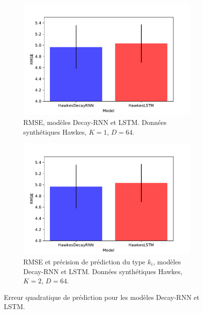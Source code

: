 \documentclass[../main.tex]{subfiles}
\begin{document}
\begin{figure}
	\centering
	\begin{subfigure}{0.47\linewidth}
		\centering
		\includegraphics[width=\linewidth]{../results/1D_Hawkes_Data_RMSE.pdf}
		\caption{RMSE, modèles Decay-RNN et LSTM. Données synthétiques Hawkes, $K=1$, $D=64$.}\label{fig:rmse1DhawkesData}	
	\end{subfigure}
	\begin{subfigure}{0.47\linewidth}
		\centering
		\includegraphics[width=\linewidth]{../results/1D_Hawkes_Data_RMSE.pdf}
		\caption{RMSE et précision de prédiction du type $k_i$, modèles Decay-RNN et LSTM. Données synthétiques Hawkes, $K=2$, $D=64$.}\label{fig:rmse2DhawkesData}	
	\end{subfigure}
	\caption{Erreur quadratique de prédiction pour les modèles Decay-RNN et LSTM.}\label{fig:rmseSynthData}
\end{figure}
\end{document}
